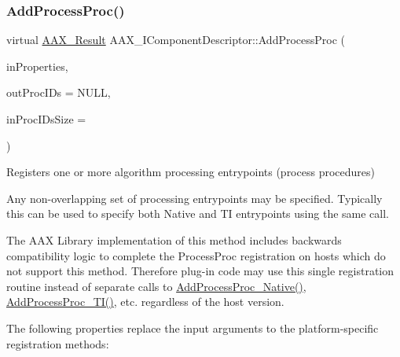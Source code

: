 \subsubsection{\texorpdfstring{AddProcessProc()}{AddProcessProc()}}
{\footnotesize\ttfamily virtual \mbox{\hyperlink{a00392_a4d8f69a697df7f70c3a8e9b8ee130d2f}{A\+A\+X\+\_\+\+Result}} A\+A\+X\+\_\+\+I\+Component\+Descriptor\+::\+Add\+Process\+Proc (\begin{DoxyParamCaption}\item[{\mbox{\hyperlink{a01869}{A\+A\+X\+\_\+\+I\+Property\+Map}} $\ast$}]{in\+Properties,  }\item[{\mbox{\hyperlink{a00392_aeaf9b387f902c50a8360ff423f4a1f23}{A\+A\+X\+\_\+\+C\+Selector}} $\ast$}]{out\+Proc\+I\+Ds = {\ttfamily NULL},  }\item[{int32\+\_\+t}]{in\+Proc\+I\+Ds\+Size = {} }\end{DoxyParamCaption})\hspace{0.3cm}{\ttfamily [pure virtual]}}



Registers one or more algorithm processing entrypoints (process procedures) 

Any non-\/overlapping set of processing entrypoints may be specified. Typically this can be used to specify both Native and TI entrypoints using the same call.

The A\+AX Library implementation of this method includes backwards compatibility logic to complete the Process\+Proc registration on hosts which do not support this method. Therefore plug-\/in code may use this single registration routine instead of separate calls to \mbox{\hyperlink{a01781_a1c069508cf54a523905c8160ebf628ad}{Add\+Process\+Proc\+\_\+\+Native()}}, \mbox{\hyperlink{a01781_a38f7fb30a378a17ce9635f5c36100a3b}{Add\+Process\+Proc\+\_\+\+T\+I()}}, etc. regardless of the host version.

The following properties replace the input arguments to the platform-\/specific registration methods\+:

